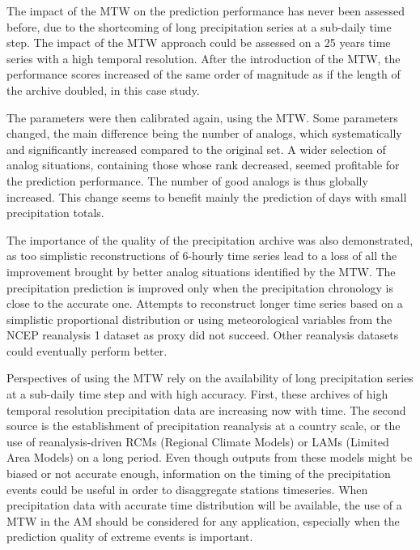 \documentclass[hess, manuscript]{copernicus}
\begin{document}
The impact of the MTW on the prediction performance has never been assessed before, due to the shortcoming of long precipitation series at a sub-daily time step. The impact of the MTW approach could be assessed on a 25 years time series with a high temporal resolution. After the introduction of the MTW, the performance scores increased of the same order of magnitude as if the length of the archive doubled, in this case study.

The parameters were then calibrated again, using the MTW. Some parameters changed, the main difference being the number of analogs, which systematically and significantly increased compared to the original set. A wider selection of analog situations, containing those whose rank decreased, seemed profitable for the prediction performance. The number of good analogs is thus globally increased. This change seems to benefit mainly the prediction of days with small precipitation totals.

The importance of the quality of the precipitation archive was also demonstrated, as too simplistic reconstructions of 6-hourly time series lead to a loss of all the improvement brought by better analog situations identified by the MTW. The precipitation prediction is improved only when the precipitation chronology is close to the accurate one. Attempts to reconstruct longer time series based on a simplistic proportional distribution or using meteorological variables from the NCEP reanalysis 1 dataset as proxy did not succeed. Other reanalysis datasets could eventually perform better.

Perspectives of using the MTW rely on the availability of long precipitation series at a sub-daily time step and with high accuracy. First, these archives of high temporal resolution precipitation data are increasing now with time. The second source is the establishment of precipitation reanalysis at a country scale, or the use of reanalysis-driven RCMs (Regional Climate Models) or LAMs (Limited Area Models) on a long period. Even though outputs from these models might be biased or not accurate enough, information on the timing of the precipitation events could be useful in order to disaggregate stations timeseries. When precipitation data with accurate time distribution will be available, the use of a MTW in the AM should be considered for any application, especially when the prediction quality of extreme events is important.
\end{document}
